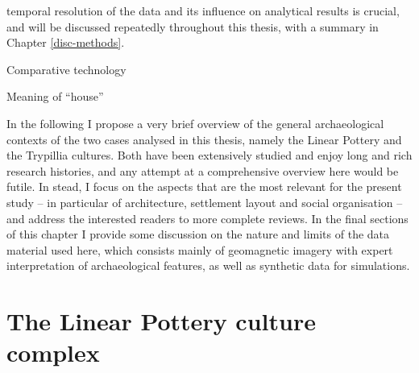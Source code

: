 \documentclass[
  12pt,
  a4paper, twoside]{book}
\begin{document}
temporal resolution of the data and its influence on analytical results is crucial, and will be discussed repeatedly throughout this thesis, with a summary in Chapter \ref{disc-methods}.

Comparative technology

Meaning of ``house''

In the following I propose a very brief overview of the general archaeological contexts of the two cases analysed in this thesis, namely the Linear Pottery and the Trypillia cultures. Both have been extensively studied and enjoy long and rich research histories, and any attempt at a comprehensive overview here would be futile. In stead, I focus on the aspects that are the most relevant for the present study -- in particular of architecture, settlement layout and social organisation -- and address the interested readers to more complete reviews. In the final sections of this chapter I provide some discussion on the nature and limits of the data material used here, which consists mainly of geomagnetic imagery with expert interpretation of archaeological features, as well as synthetic data for simulations.

\hypertarget{lbk}{%
\section{The Linear Pottery culture complex}\label{lbk}}
\end{document}
